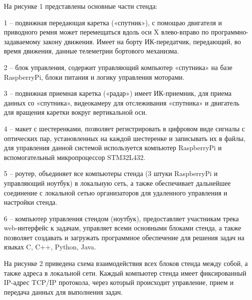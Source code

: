 На рисунке 1 представлены основные части стенда:

1 – подвижная передающая каретка («спутник»), с помощью двигателя и приводного ремня может перемещаться вдоль оси X влево-вправо по программно-задаваемому закону движения. Имеет на борту ИК-передатчик, передающий, во время движения, данные телеметрии бортового механизма.

2 – блок управления, содержит управляющий компьютер «спутника» на базе RaspberryPi, блоки питания и логику управления моторами.

3 – подвижная приемная каретка («радар») имеет ИК-приемник, для приема данных со «спутника», видеокамеру для отслеживания «спутника» и двигатель для вращения каретки вокруг вертикальной оси.

4 – макет с шестеренками, позволяет регистрировать в цифровом виде сигналы с оптических пар, установленных на каждой шестеренке и записывать их в файлы, для управления данной системой используется компьютер RaspberryPi и вспомогательный микропроцессор STM32L432.

5 – роутер, объединяет все компьютеры стенда (3 штуки RaspberryPi и управляющий ноутбук) в локальную сеть, а также обеспечивает дальнейшее соединение с локальной сетью организаторов для удаленного управления и настройки стенда.

6 – компьютер управления стендом (ноутбук), предоставляет участникам трека web-интерфейс к задачам, управляет всеми основными блоками стенда, а также позволяет создавать и загружать программное обеспечение для решения задач на языках C, C++, Python, Java.

На рисунке 2 приведена схема взаимодействия всех блоков стенда между собой, а также адреса в локальной сети. Каждый компьютер стенда имеет фиксированный IP-адрес TCP/IP протокола, через который происходит управление, прием и передача данных для выполнения задач.